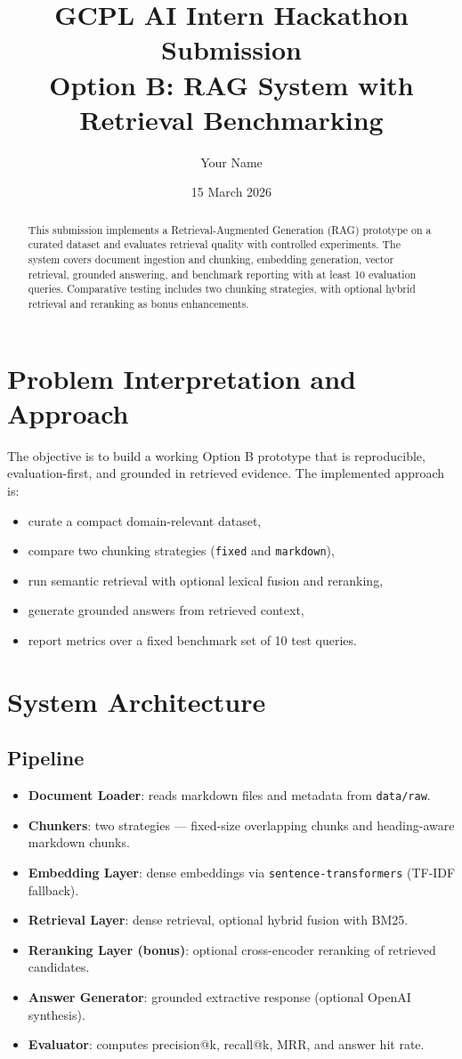 \documentclass[11pt,a4paper]{article}
\title{\textbf{GCPL AI Intern Hackathon Submission}\\
Option B: RAG System with Retrieval Benchmarking}
\author{Your Name}
\date{15 March 2026}
\begin{document}
\maketitle

\begin{abstract}
This submission implements a Retrieval-Augmented Generation (RAG) prototype on a curated dataset and evaluates retrieval quality with controlled experiments. The system covers document ingestion and chunking, embedding generation, vector retrieval, grounded answering, and benchmark reporting with at least 10 evaluation queries. Comparative testing includes two chunking strategies, with optional hybrid retrieval and reranking as bonus enhancements.
\end{abstract}

\section{Problem Interpretation and Approach}
The objective is to build a working Option B prototype that is reproducible, evaluation-first, and grounded in retrieved evidence. The implemented approach is:
\begin{itemize}
  \item curate a compact domain-relevant dataset,
  \item compare two chunking strategies (\texttt{fixed} and \texttt{markdown}),
  \item run semantic retrieval with optional lexical fusion and reranking,
  \item generate grounded answers from retrieved context,
  \item report metrics over a fixed benchmark set of 10 test queries.
\end{itemize}

\section{System Architecture}
\subsection{Pipeline}
\begin{itemize}
  \item \textbf{Document Loader}: reads markdown files and metadata from \texttt{data/raw}.
  \item \textbf{Chunkers}: two strategies --- fixed-size overlapping chunks and heading-aware markdown chunks.
  \item \textbf{Embedding Layer}: dense embeddings via \texttt{sentence-transformers} (TF-IDF fallback).
  \item \textbf{Retrieval Layer}: dense retrieval, optional hybrid fusion with BM25.
  \item \textbf{Reranking Layer (bonus)}: optional cross-encoder reranking of retrieved candidates.
  \item \textbf{Answer Generator}: grounded extractive response (optional OpenAI synthesis).
  \item \textbf{Evaluator}: computes precision@k, recall@k, MRR, and answer hit rate.
\end{itemize}
\end{document}
